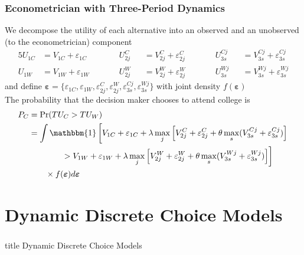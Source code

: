 \documentclass{beamer}
\begin{document}
\begin{frame}\frametitle{Econometrician with Three-Period Dynamics}
    We decompose the utility of each alternative into an observed and an unobserved (to the econometrician) component
    \begin{alignat*}{5}
        U_{1C} & = V_{1C} + \varepsilon_{1C} \qquad && U_{2j}^C && = V_{2j}^C + \varepsilon_{2j}^C \qquad && U_{3s}^{Cj} && = V_{3s}^{Cj} + \varepsilon_{3s}^{Cj} \\
        U_{1W} & = V_{1W} + \varepsilon_{1W} \qquad && U_{2j}^W && = V_{2j}^W + \varepsilon_{2j}^W \qquad && U_{3s}^{Wj} && = V_{3s}^{Wj} + \varepsilon_{3s}^{Wj} 
    \end{alignat*}
    and define $\bm{\varepsilon} = \{\varepsilon_{1C},\varepsilon_{1W}, \varepsilon_{2j}^C, \varepsilon_{2j}^W, \varepsilon_{3s}^{Cj}, \varepsilon_{3s}^{Wj}\}$ with joint density $f(\bm{\varepsilon})$ \\
    \vspace{3ex}
    The probability that the decision maker chooses to attend college is
    \begin{align*}
        P_C & = \Pr(TU_C > TU_W) \\
        & = \int \mathbbm{1} \left[ V_{1C} + \varepsilon_{1C} + \lambda \max_j \left[ V_{2j}^C + \varepsilon_{2j}^C + \theta \max_s (V_{3s}^{Cj} + \varepsilon_{3s}^{Cj}) \right] \right. \\
        & \left. \qquad \qquad > V_{1W} + \varepsilon_{1W} + \lambda \max_j \left[ V_{2j}^W + \varepsilon_{2j}^W + \theta \max_s (V_{3s}^{Wj} + \varepsilon_{3s}^{Wj}) \right] \right] \\
        & \qquad \times f(\bm{\varepsilon}) d \bm{\varepsilon}
    \end{align*}
\end{frame}

\section{Dynamic Discrete Choice Models}
\label{ddc}
\begin{frame}\frametitle{}
    \vfill
    \centering
    \begin{beamercolorbox}[center]{title}
        \Large Dynamic Discrete Choice Models
    \end{beamercolorbox}
    \vfill
\end{frame}
\end{document}
